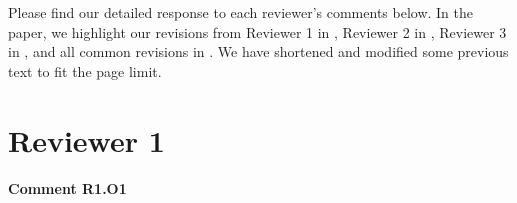 Please find our detailed response to each reviewer's comments below. In the paper, we highlight our revisions from Reviewer 1 in , Reviewer 2 in , Reviewer 3 in , and all common revisions in . We have shortened and modified some previous text to fit the page limit.




\section*{Reviewer 1}

\paragraph{Comment R1.O1} 

